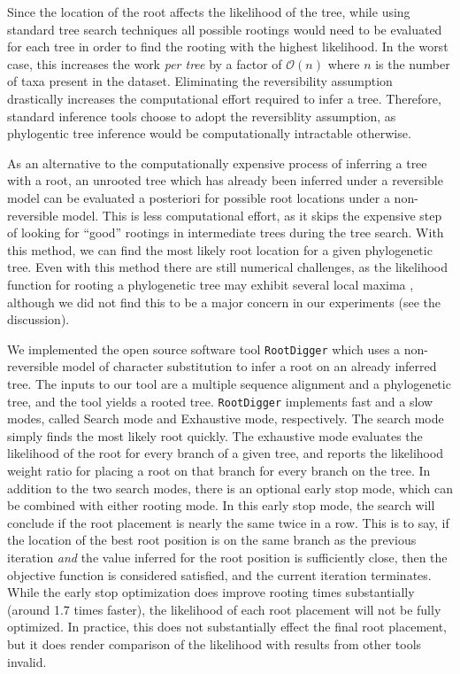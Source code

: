 \documentclass{article}
\newcommand{\RootDiggertt}{\texttt{RootDigger}}
\begin{document}
Since the location of the root affects the likelihood of the tree, while using
standard tree search techniques all possible rootings would need to be evaluated
for each tree in order to find the rooting with the highest likelihood.  In the
worst case, this increases the work {\em per tree} by a factor of
$\mathcal{O}(n)$ where $n$ is the number of taxa present in the dataset.
Eliminating the reversibility assumption drastically increases the computational
effort required to infer a tree. Therefore, standard inference tools choose to
adopt the reversiblity assumption, as phylogentic tree inference would be
computationally intractable otherwise.

As an alternative to the computationally expensive process of inferring a tree
with a root, an unrooted tree which has already been inferred under a reversible
model can be evaluated a posteriori for possible root locations under a
non-reversible model.  This is less computational effort, as it skips the
expensive step of looking for ``good'' rootings in intermediate trees during the
tree search.  With this method, we can find the most likely root location for a
given phylogenetic tree.  Even with this method there are still numerical
challenges, as the likelihood function for rooting a phylogenetic tree may
exhibit several local maxima \cite{huelsenbeck_inferring_2002}, although we did
not find this to be a major concern in our experiments (see the discussion).

We implemented the open source software tool \RootDiggertt{} which uses a
non-reversible model of character substitution to infer a root on an already
inferred tree. The inputs to our tool are a multiple sequence alignment and a
phylogenetic tree, and the tool yields a rooted tree. \RootDiggertt{} implements
fast and a slow modes, called Search mode and Exhaustive mode, respectively. The
search mode simply finds the most likely root quickly. The exhaustive mode
evaluates the likelihood of the root for every branch of a given tree, and
reports the likelihood weight ratio \cite{strimmer_inferring_2002} for placing a
root on that branch for every branch on the tree. In addition to the two search
modes, there is an optional early stop mode, which can be combined with either
rooting mode. In this early stop mode, the search will conclude if the root
placement is nearly the same twice in a row. This is to say, if the location of
the best root position is on the same branch as the previous iteration {\em and}
the value inferred for the root position is sufficiently close, then the
objective function is considered satisfied, and the current iteration
terminates.  While the early stop optimization does improve rooting times
substantially (around 1.7 times faster), the likelihood of each root placement
will not be fully optimized.  In practice, this does not substantially effect
the final root placement, but it does render comparison of the likelihood with
results from other tools invalid.
\end{document}
